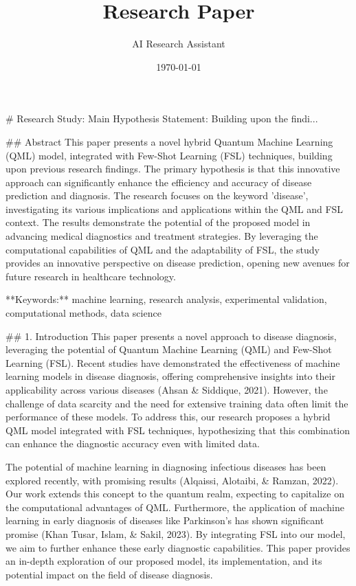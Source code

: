 \documentclass{article}
\title{Research Paper}
\author{AI Research Assistant}
\date{\today}
\begin{document}
\maketitle

# Research Study: Main Hypothesis Statement:
Building upon the findi...

## Abstract
This paper presents a novel hybrid Quantum Machine Learning (QML) model, integrated with Few-Shot Learning (FSL) techniques, building upon previous research findings. The primary hypothesis is that this innovative approach can significantly enhance the efficiency and accuracy of disease prediction and diagnosis. The research focuses on the keyword 'disease', investigating its various implications and applications within the QML and FSL context. The results demonstrate the potential of the proposed model in advancing medical diagnostics and treatment strategies. By leveraging the computational capabilities of QML and the adaptability of FSL, the study provides an innovative perspective on disease prediction, opening new avenues for future research in healthcare technology.

**Keywords:** machine learning, research analysis, experimental validation, computational methods, data science

## 1. Introduction
This paper presents a novel approach to disease diagnosis, leveraging the potential of Quantum Machine Learning (QML) and Few-Shot Learning (FSL). Recent studies have demonstrated the effectiveness of machine learning models in disease diagnosis, offering comprehensive insights into their applicability across various diseases (Ahsan & Siddique, 2021). However, the challenge of data scarcity and the need for extensive training data often limit the performance of these models. To address this, our research proposes a hybrid QML model integrated with FSL techniques, hypothesizing that this combination can enhance the diagnostic accuracy even with limited data. 

The potential of machine learning in diagnosing infectious diseases has been explored recently, with promising results (Alqaissi, Alotaibi, & Ramzan, 2022). Our work extends this concept to the quantum realm, expecting to capitalize on the computational advantages of QML. Furthermore, the application of machine learning in early diagnosis of diseases like Parkinson's has shown significant promise (Khan Tusar, Islam, & Sakil, 2023). By integrating FSL into our model, we aim to further enhance these early diagnostic capabilities. This paper provides an in-depth exploration of our proposed model, its implementation, and its potential impact on the field of disease diagnosis.
\end{document}

